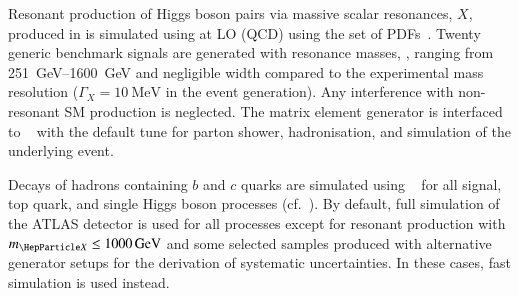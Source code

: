 Resonant production of Higgs boson pairs via massive scalar
resonances, $X$, produced in \ggF is simulated using \MGNLO at LO
(QCD) using the \NNPDF[2.3lo] set of PDFs~\cite{Ball:2012cx}. Twenty
generic benchmark signals are generated with resonance masses, \mX,
ranging from \SIrange{251}{1600}{\GeV} and negligible width compared
to the experimental mass resolution ($\Gamma_{X} = \SI{10}{\MeV}$ in
the event generation). Any interference with non-resonant SM \HH
production is neglected. The matrix element generator is interfaced to
\HERWIG[7.1]~\cite{Gieseke:2012ft,Bellm:2017jjp} with the default tune
for parton shower, hadronisation, and simulation of the underlying
event.

Decays of hadrons containing $b$ and $c$ quarks are simulated using
\EVTGEN~\cite{Lange:2001uf} for all signal, top quark, and single Higgs boson
processes (cf.~). By default, full simulation of the ATLAS
detector is used for all processes except for resonant \HH production with
$\mX \leq \SI{1000}{\GeV}$ and some selected samples produced with alternative
generator setups for the derivation of systematic uncertainties. In these cases,
fast simulation is used instead.


